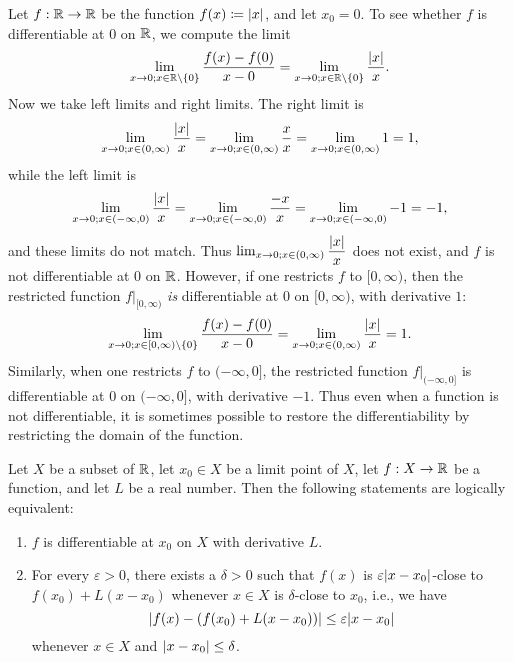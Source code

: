 \begin{eg}\label{10.1.6}
  Let \(f : \mathbb{R} \to \mathbb{R}\) be the function \(f(x) \coloneqq \left\lvert x\right\rvert\), and let \(x_0 = 0\).
  To see whether \(f\) is differentiable at \(0\) on \(\mathbb{R}\), we compute the limit
  \[
    \lim_{x \to 0 ; x \in \mathbb{R} \setminus \{0\}} \dfrac{f(x) - f(0)}{x - 0} = \lim_{x \to 0 ; x \in \mathbb{R} \setminus \{0\}} \dfrac{\left\lvert x\right\rvert}{x}.
  \]
  Now we take left limits and right limits.
  The right limit is
  \[
    \lim_{x \to 0 ; x \in (0, \infty)} \dfrac{\left\lvert x\right\rvert}{x} = \lim_{x \to 0 ; x \in (0, \infty)} \dfrac{x}{x} = \lim_{x \to 0 ; x \in (0, \infty)} 1 = 1,
  \]
  while the left limit is
  \[
    \lim_{x \to 0 ; x \in (-\infty, 0)} \dfrac{\left\lvert x\right\rvert}{x} = \lim_{x \to 0 ; x \in (-\infty, 0)} \dfrac{-x}{x} = \lim_{x \to 0 ; x \in (-\infty, 0)} -1 = -1,
  \]
  and these limits do not match.
  Thus \(\lim_{x \to 0 ; x \in (0, \infty)} \dfrac{\left\lvert x\right\rvert}{x}\) does not exist, and \(f\) is not differentiable at \(0\) on \(\mathbb{R}\).
  However, if one restricts \(f\) to \([0, \infty)\), then the restricted function \(f|_{[0, \infty)}\) \emph{is} differentiable at \(0\) on \([0, \infty)\), with derivative \(1\):
  \[
  \lim_{x \to 0 ; x \in [0, \infty) \setminus \{0\}} \dfrac{f(x) - f(0)}{x - 0} = \lim_{x \to 0 ; x \in (0, \infty)} \dfrac{\left\lvert x\right\rvert}{x} = 1.
    \]
    Similarly, when one restricts \(f\) to \((-\infty, 0]\), the restricted function \(f|_{(-\infty, 0]}\) is differentiable at \(0\) on \((-\infty, 0]\), with derivative \(-1\).
  Thus even when a function is not differentiable, it is sometimes possible to restore the differentiability by restricting the domain of the function.
\end{eg}

\begin{prop}\label{10.1.7}
  Let \(X\) be a subset of \(\mathbb{R}\), let \(x_0 \in X\) be a limit point of \(X\), let \(f : X \to \mathbb{R}\) be a function, and let \(L\) be a real number.
  Then the following statements are logically equivalent:
  \begin{enumerate}
    \item \(f\) is differentiable at \(x_0\) on \(X\) with derivative \(L\).
    \item For every \(\varepsilon > 0\), there exists a \(\delta > 0\) such that \(f(x)\) is \(\varepsilon \abs{x - x_0}\)-close to \(f(x_0) + L(x - x_0)\) whenever \(x \in X\) is \(\delta\)-close to \(x_0\), i.e., we have
          \[
            \abs{f(x) - (f(x_0) + L(x - x_0))} \leq \varepsilon \abs{x - x_0}
          \]
          whenever \(x \in X\) and \(\left\lvert x - x_0\right\rvert \leq \delta\).
  \end{enumerate}
\end{prop}

